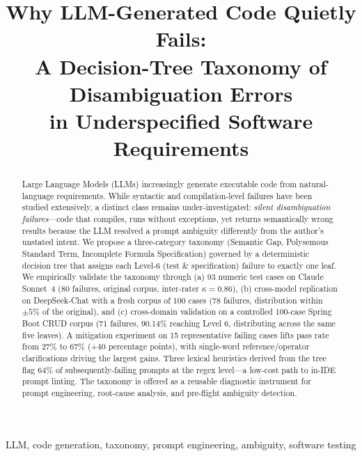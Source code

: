\documentclass[conference]{IEEEtran}
\begin{document}
\title{Why LLM-Generated Code Quietly Fails:\\A Decision-Tree Taxonomy of Disambiguation Errors\\in Underspecified Software Requirements}

\author{
}

\maketitle

\begin{abstract}
Large Language Models (LLMs) increasingly generate executable code from natural-language requirements. While syntactic and compilation-level failures have been studied extensively, a distinct class remains under-investigated: \emph{silent disambiguation failures}—code that compiles, runs without exceptions, yet returns semantically wrong results because the LLM resolved a prompt ambiguity differently from the author's unstated intent. We propose a three-category taxonomy (Semantic Gap, Polysemous Standard Term, Incomplete Formula Specification) governed by a deterministic decision tree that assigns each Level-6 (test \& specification) failure to exactly one leaf. We empirically validate the taxonomy through (a) 93 numeric test cases on Claude Sonnet~4 (80 failures, original corpus, inter-rater $\kappa{=}0.86$), (b) cross-model replication on DeepSeek-Chat with a fresh corpus of 100 cases (78 failures, distribution within $\pm 5\%$ of the original), and (c) cross-domain validation on a controlled 100-case Spring Boot CRUD corpus (71 failures, 90.14\% reaching Level 6, distributing across the same five leaves). A mitigation experiment on 15 representative failing cases lifts pass rate from 27\% to 67\% (+40 percentage points), with single-word reference/operator clarifications driving the largest gains. Three lexical heuristics derived from the tree flag 64\% of subsequently-failing prompts at the regex level---a low-cost path to in-IDE prompt linting. The taxonomy is offered as a reusable diagnostic instrument for prompt engineering, root-cause analysis, and pre-flight ambiguity detection.
\end{abstract}

\begin{IEEEkeywords}
LLM, code generation, taxonomy, prompt engineering, ambiguity, software testing
\end{IEEEkeywords}
\end{document}
